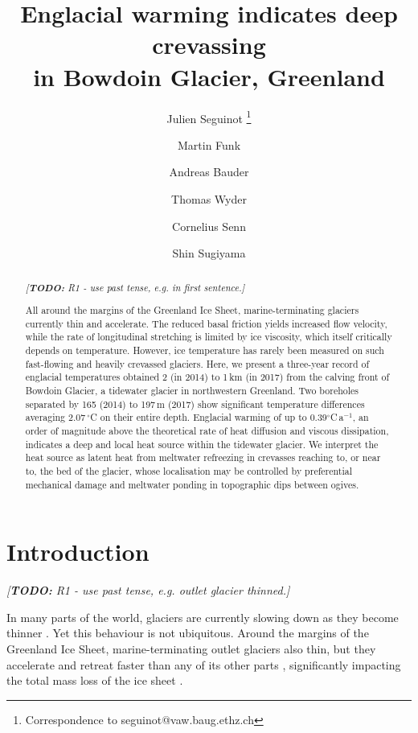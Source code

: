\documentclass[utf8]{article}
\title{Englacial warming indicates deep crevassing\\
       in Bowdoin Glacier, Greenland}
\author[1]{Julien Seguinot
           \thanks{Correspondence to seguinot@vaw.baug.ethz.ch}}
\author[1]{Martin Funk}
\author[1]{Andreas Bauder}
\author[1]{Thomas Wyder}
\author[2]{Cornelius Senn}
\author[3]{Shin Sugiyama}
\affil[1]{Laboratory of Hydraulics, Hydrology and Glaciology,
          ETH Zürich, Switzerland}
\affil[2]{Department of Civil, Environmental and Geomatic Engineering,
          ETH Zürich, Switzerland}
\affil[3]{Institute of Low Temperature Science, Hokkaido University,
          Sapporo, Japan}
\newcommand{\todo}[1]{\textcolor{c3}{\emph{[\textbf{TODO:} #1]}}}
\begin{document}

\maketitle

\begin{abstract}

    \todo{R1 - use past tense, e.g. in first sentence.}

    All around the margins of the Greenland Ice Sheet, marine-terminating
    glaciers currently thin and accelerate. The reduced basal friction yields
    increased flow velocity, while the rate of longitudinal stretching is
    limited by ice viscosity, which itself critically depends
    on temperature. However, ice temperature has rarely
    been measured on such fast-flowing and heavily crevassed glaciers.
    Here, we present a three-year record of englacial temperatures obtained
    2 (in 2014) to 1\,km (in 2017) from the calving front of Bowdoin Glacier, a
    tidewater glacier in northwestern Greenland. Two boreholes separated by 165
    (2014) to 197\,m (2017) show significant temperature differences averaging
    2.07\,$^\circ$C on their entire depth. Englacial warming of up to
    0.39$^\circ$C\,a$^{-1}$, an order of magnitude above the theoretical rate
    of heat diffusion and viscous dissipation, indicates a deep and local heat
    source within the tidewater glacier.
    We interpret the heat source as latent heat from meltwater refreezing in
    crevasses reaching to, or near to, the bed of the glacier, whose localisation
    may be controlled by preferential mechanical damage and meltwater ponding
    in topographic dips between ogives.

\end{abstract}

\section{Introduction}

    \todo{R1 - use past tense, e.g. outlet glacier thinned.}

    In many parts of the world, glaciers are currently slowing down as they
    become thinner \citep{Heid.Kaab.2012, Dehecq.etal.2018}. Yet this behaviour
    is not ubiquitous. Around the margins of
    the Greenland Ice Sheet, marine-terminating outlet glaciers also thin, but
    they accelerate and retreat faster than any of its other parts
    \citep[e.g.,][]{Krabill.etal.2000, Rignot.Kanagaratnam.2006,
    Pritchard.etal.2009, Hill.etal.2017}, significantly impacting the total
    mass loss of the ice sheet \citep[e.g.,][]{Enderlin.etal.2014,
    Khan.etal.2015, McMillan.etal.2016}.
\end{document}
